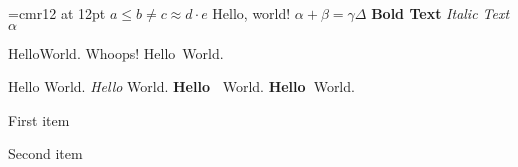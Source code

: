 \font\myfont=cmr12 at 12pt  %
\myfont
$a \leq b \neq c \approx d \cdot e$
Hello, world!
$\alpha + \beta = \gamma \Delta$
{\bf Bold Text} {\it Italic Text}
$\alpha$

\def\thello{Hello}
\thello World. Whoops! \thello\ World.\par
\thello{} World. {\it\thello} World. {\bf\thello\ } World. {\bf\thello\ }World.

\item First item
\item Second item
\bye
